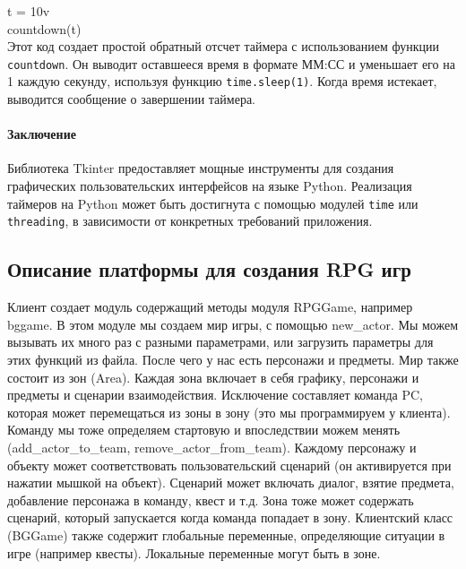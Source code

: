 	t = 10v\\
	countdown(t)\\
	
Этот код создает простой обратный отсчет таймера с использованием функции \texttt{countdown}. Он выводит оставшееся время в формате ММ:СС и уменьшает его на 1 каждую секунду, используя функцию \texttt{time.sleep(1)}. Когда время истекает, выводится сообщение о завершении таймера.
	
\paragraph{Заключение}
Библиотека Tkinter предоставляет мощные инструменты для создания графических пользовательских интерфейсов на языке Python. Реализация таймеров на Python может быть достигнута с помощью модулей \texttt{time} или \texttt{threading}, в зависимости от конкретных требований приложения.

\subsection{Описание платформы для создания RPG игр}
Клиент создает модуль содержащий методы модуля RPGGame, например bggame. В этом модуле мы создаем мир игры, с помощью new\_actor. Мы можем вызывать их много раз с разными параметрами, или загрузить параметры для этих функций из файла. После чего у нас есть персонажи и предметы. Мир также состоит из зон (Area). Каждая зона включает в себя графику, персонажи и предметы и сценарии взаимодействия. Исключение составляет команда PC, которая может перемещаться из зоны в зону (это мы программируем у клиента). Команду мы тоже определяем стартовую и впоследствии можем менять (add\_actor\_to\_team, remove\_actor\_from\_team). Каждому персонажу и объекту может соответствовать пользовательский сценарий (он активируется при нажатии мышкой на объект). Сценарий может включать диалог, взятие предмета, добавление персонажа в команду, квест и т.д.
Зона тоже может содержать сценарий, который запускается когда команда попадает в зону.
Клиентский класс (BGGame) также содержит глобальные переменные, определяющие ситуации в игре (например квесты). Локальные переменные могут быть в зоне.

